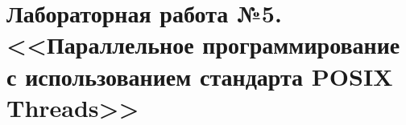 \section{Лабораторная работа №5. <<Параллельное программирование с использованием стандарта POSIX Threads>>}




